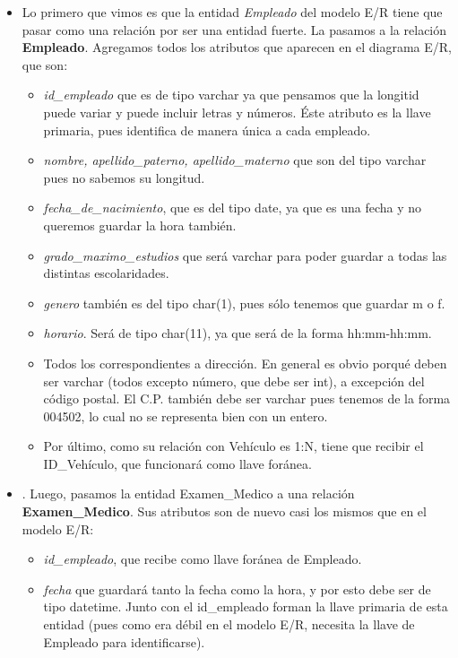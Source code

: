 \documentclass[11pt]{article}
\begin{document}
\begin{itemize}
\item Lo primero que vimos es que la entidad \textit{Empleado} del modelo E/R tiene que pasar como una relación por ser una entidad fuerte. La pasamos a la relación \textbf{Empleado}. Agregamos todos los atributos que aparecen en el diagrama E/R, que son:
    \begin{itemize}
    \item \textit{id\_empleado} que es de tipo varchar ya que pensamos que la longitid puede variar y puede incluir letras y números. Éste atributo es la llave primaria, pues identifica de manera única a cada empleado. 
    \item \textit{nombre, apellido\_paterno, apellido\_materno} que son del tipo varchar pues no sabemos su longitud.
    \item \textit{fecha\_de\_nacimiento}, que es del tipo date, ya que es una fecha y no queremos guardar la hora también.
    \item \textit{grado\_maximo\_estudios} que será varchar para poder guardar a todas las distintas escolaridades.
    \item \textit{genero} también es del tipo char(1), pues sólo tenemos que guardar m o f. 
    \item \textit{horario}. Será de tipo char(11), ya que será de la forma hh:mm-hh:mm.
    \item Todos los correspondientes a dirección. En general es obvio porqué deben ser varchar (todos excepto número, que debe ser int), a excepción del código postal. El C.P. también debe ser varchar pues tenemos de la forma 004502, lo cual no se representa bien con un entero. 
    \item Por último, como su relación con Vehículo es 1:N, tiene que recibir el ID\_Vehículo, que funcionará como llave foránea. 
    \end{itemize}
\item. Luego, pasamos la entidad Examen\_Medico a una relación \textbf{Examen\_Medico}. Sus atributos son de nuevo casi los mismos que en el modelo E/R:
    \begin{itemize}
    \item \textit{id\_empleado}, que recibe como llave foránea de Empleado.
    \item \textit{fecha} que guardará tanto la fecha como la hora, y por esto debe ser de tipo datetime. Junto con el id\_empleado forman la llave primaria de esta entidad (pues como era débil en el modelo E/R, necesita la llave de Empleado para identificarse).

\end{itemize}
\end{itemize}
\end{document}
